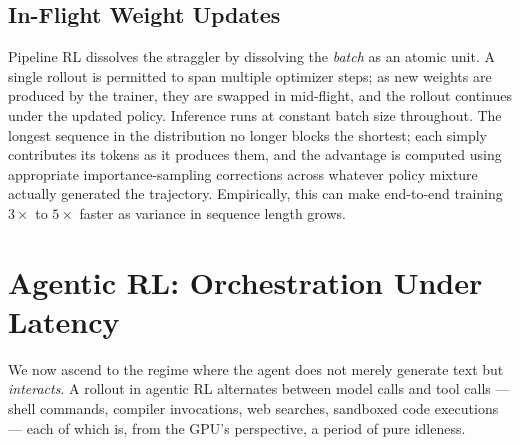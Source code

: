 \documentclass[11pt,a4paper]{article}
\theoremstyle{definition}
\theoremstyle{plain}
\begin{document}
\subsection{In-Flight Weight Updates}

Pipeline RL dissolves the straggler by dissolving the \emph{batch} as an atomic unit. A single rollout is permitted to span multiple optimizer steps; as new weights are produced by the trainer, they are swapped in mid-flight, and the rollout continues under the updated policy. Inference runs at constant batch size throughout. The longest sequence in the distribution no longer blocks the shortest; each simply contributes its tokens as it produces them, and the advantage is computed using appropriate importance-sampling corrections across whatever policy mixture actually generated the trajectory. Empirically, this can make end-to-end training $3\!\times$ to $5\!\times$ faster as variance in sequence length grows.

\section{Agentic RL: Orchestration Under Latency}

We now ascend to the regime where the agent does not merely generate text but \emph{interacts}. A rollout in agentic RL alternates between model calls and tool calls --- shell commands, compiler invocations, web searches, sandboxed code executions --- each of which is, from the GPU's perspective, a period of pure idleness.

\begin{center}
\end{center}
\end{document}
